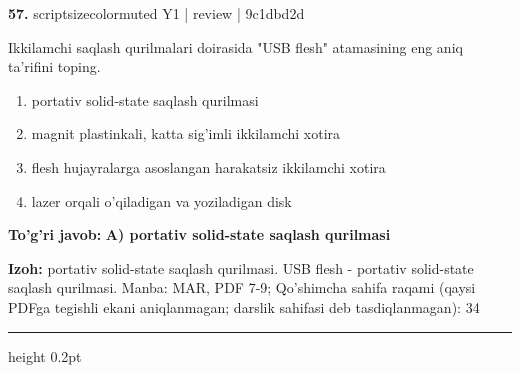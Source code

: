 \documentclass[10pt,a4paper]{article}
\begin{document}
{\bfseries\sffamily\color{ink} 57.} {scriptsizecolor{muted} Y1 | review | 9c1dbd2d}
\par
Ikkilamchi saqlash qurilmalari doirasida "USB flesh" atamasining eng aniq ta'rifini toping.
\begin{enumerate}[label=\Alph*),leftmargin=9mm]
\item portativ solid-state saqlash qurilmasi
\item magnit plastinkali, katta sig'imli ikkilamchi xotira
\item flesh hujayralarga asoslangan harakatsiz ikkilamchi xotira
\item lazer orqali o'qiladigan va yoziladigan disk
\end{enumerate}
\begin{tcolorbox}[enhanced,breakable,colback=teal!4,colframe=teal!60!black,boxrule=0.45pt,arc=1.2mm,left=2.7mm,right=2.7mm,top=1.8mm,bottom=1.8mm,before skip=2mm,after skip=2mm]
{\bfseries\sffamily\color{teal}To'g'ri javob:} \textbf{A) portativ solid-state saqlash qurilmasi}
\par\smallskip
{\bfseries Izoh:} portativ solid-state saqlash qurilmasi. USB flesh - portativ solid-state saqlash qurilmasi. Manba: MAR, PDF 7-9; Qo'shimcha sahifa raqami (qaysi PDFga tegishli ekani aniqlanmagan; darslik sahifasi deb tasdiqlanmagan): 34
\end{tcolorbox}
\vspace{2mm}\hrule height 0.2pt\vspace{3mm}
\end{document}
